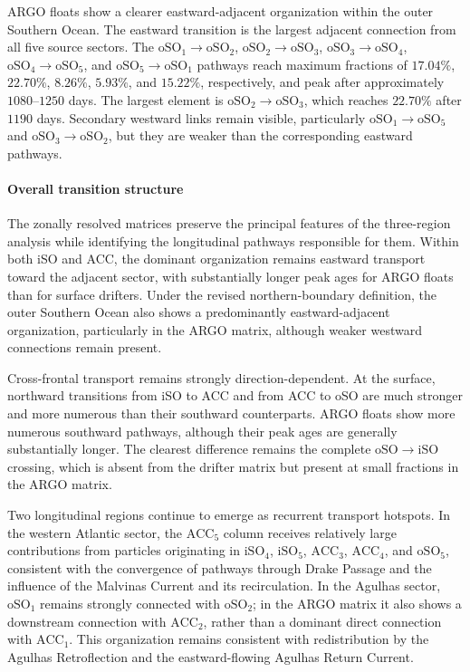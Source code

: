\documentclass[
  draft
]{agujournal2025}
\begin{document}
                ARGO floats show a clearer eastward-adjacent organization within the outer Southern Ocean. The eastward transition is the largest adjacent connection from all five source sectors. The $\mathrm{oSO}_1 \rightarrow \mathrm{oSO}_2$, $\mathrm{oSO}_2 \rightarrow \mathrm{oSO}_3$, $\mathrm{oSO}_3 \rightarrow \mathrm{oSO}_4$, $\mathrm{oSO}_4 \rightarrow \mathrm{oSO}_5$, and $\mathrm{oSO}_5 \rightarrow \mathrm{oSO}_1$ pathways reach maximum fractions of $17.04 \%$, $22.70 \%$, $8.26 \%$, $5.93 \%$, and $15.22 \%$, respectively, and peak after approximately $1080$--$1250$ days. The largest element is $\mathrm{oSO}_2 \rightarrow \mathrm{oSO}_3$, which reaches $22.70 \%$ after $1190$ days. Secondary westward links remain visible, particularly $\mathrm{oSO}_1 \rightarrow \mathrm{oSO}_5$ and $\mathrm{oSO}_3 \rightarrow \mathrm{oSO}_2$, but they are weaker than the corresponding eastward pathways.
    
                
            \paragraph{Overall transition structure}
                The zonally resolved matrices preserve the principal features of the three-region analysis while identifying the longitudinal pathways responsible for them. Within both iSO and ACC, the dominant organization remains eastward transport toward the adjacent sector, with substantially longer peak ages for ARGO floats than for surface drifters. Under the revised northern-boundary definition, the outer Southern Ocean also shows a predominantly eastward-adjacent organization, particularly in the ARGO matrix, although weaker westward connections remain present.

                Cross-frontal transport remains strongly direction-dependent. At the surface, northward transitions from iSO to ACC and from ACC to oSO are much stronger and more numerous than their southward counterparts. ARGO floats show more numerous southward pathways, although their peak ages are generally substantially longer. The clearest difference remains the complete $\mathrm{oSO} \rightarrow \mathrm{iSO}$ crossing, which is absent from the drifter matrix but present at small fractions in the ARGO matrix.

                Two longitudinal regions continue to emerge as recurrent transport hotspots. In the western Atlantic sector, the $\mathrm{ACC}_5$ column receives relatively large contributions from particles originating in $\mathrm{iSO}_4$, $\mathrm{iSO}_5$, $\mathrm{ACC}_3$, $\mathrm{ACC}_4$, and $\mathrm{oSO}_5$, consistent with the convergence of pathways through Drake Passage and the influence of the Malvinas Current and its recirculation. In the Agulhas sector, $\mathrm{oSO}_1$ remains strongly connected with $\mathrm{oSO}_2$; in the ARGO matrix it also shows a downstream connection with $\mathrm{ACC}_2$, rather than a dominant direct connection with $\mathrm{ACC}_1$. This organization remains consistent with redistribution by the Agulhas Retroflection and the eastward-flowing Agulhas Return Current.
\end{document}

